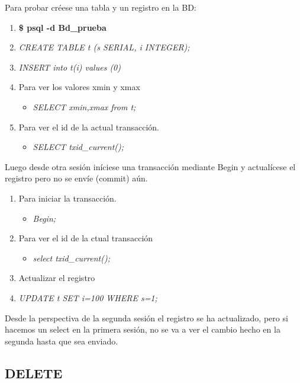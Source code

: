 Para probar créese una tabla y un registro en la BD:

\begin{enumerate}
\item \textbf{\$ psql -d Bd\_prueba}
\item \textit{CREATE TABLE t (s SERIAL, i INTEGER);}
\item \textit{INSERT into t(i) values (0)}
\item Para ver los valores xmin y xmax

\begin{itemize}
\item \textit{SELECT xmin,xmax from t;}
\end{itemize}

\item Para ver el id de la actual transacción.

\begin{itemize}
\item \textit{SELECT txid\_current();}
\end{itemize}

\end{enumerate}

Luego desde otra sesión iníciese una transacción mediante Begin y actualícese el registro pero no se envíe (commit) aún.

\begin{enumerate}
\item Para iniciar la transacción.
\begin{itemize}
\item \textit{Begin;}
\end{itemize}
\item Para ver el id de la ctual transacción
\begin{itemize}
\item \textit{select txid\_current();}
\end{itemize}
\item Actualizar el registro
\item \textit{UPDATE t SET i=100 WHERE s=1;}
\end{enumerate}

Desde la perspectiva de la segunda sesión el registro se ha actualizado, pero si hacemos un select en la primera sesión, no se va a ver el cambio hecho en la segunda hasta que sea enviado.

\subsection{DELETE}

